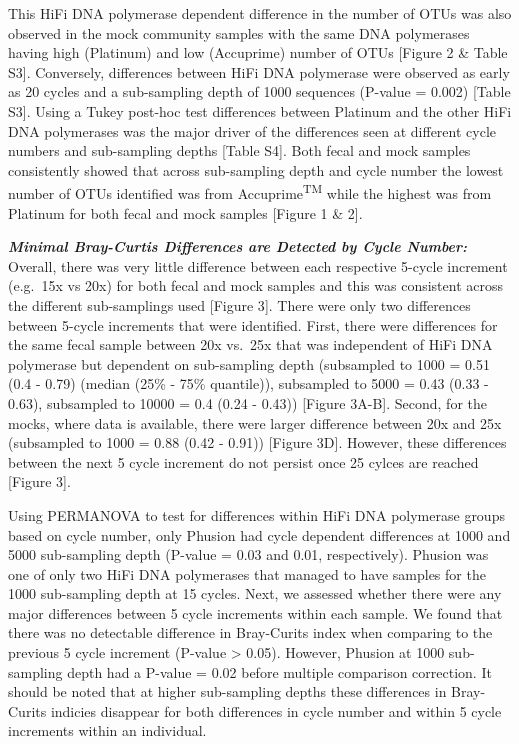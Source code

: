 \documentclass[12pt,]{article}
\begin{document}
This HiFi DNA polymerase dependent difference in the number of OTUs was
also observed in the mock community samples with the same DNA
polymerases having high (Platinum) and low (Accuprime) number of OTUs
{[}Figure 2 \& Table S3{]}. Conversely, differences between HiFi DNA
polymerase were observed as early as 20 cycles and a sub-sampling depth
of 1000 sequences (P-value = 0.002) {[}Table S3{]}. Using a Tukey
post-hoc test differences between Platinum and the other HiFi DNA
polymerases was the major driver of the differences seen at different
cycle numbers and sub-sampling depths {[}Table S4{]}. Both fecal and
mock samples consistently showed that across sub-sampling depth and
cycle number the lowest number of OTUs identified was from
Accuprime\textsuperscript{TM} while the highest was from Platinum for
both fecal and mock samples {[}Figure 1 \& 2{]}.

\textbf{\emph{Minimal Bray-Curtis Differences are Detected by Cycle
Number:}} Overall, there was very little difference between each
respective 5-cycle increment (e.g.~15x vs 20x) for both fecal and mock
samples and this was consistent across the different sub-samplings used
{[}Figure 3{]}. There were only two differences between 5-cycle
increments that were identified. First, there were differences for the
same fecal sample between 20x vs.~25x that was independent of HiFi DNA
polymerase but dependent on sub-sampling depth (subsampled to 1000 =
0.51 (0.4 - 0.79) (median (25\% - 75\% quantile)), subsampled to 5000 =
0.43 (0.33 - 0.63), subsampled to 10000 = 0.4 (0.24 - 0.43)) {[}Figure
3A-B{]}. Second, for the mocks, where data is available, there were
larger difference between 20x and 25x (subsampled to 1000 = 0.88 (0.42 -
0.91)) {[}Figure 3D{]}. However, these differences between the next 5
cycle increment do not persist once 25 cylces are reached {[}Figure
3{]}.

Using PERMANOVA to test for differences within HiFi DNA polymerase
groups based on cycle number, only Phusion had cycle dependent
differences at 1000 and 5000 sub-sampling depth (P-value = 0.03 and
0.01, respectively). Phusion was one of only two HiFi DNA polymerases
that managed to have samples for the 1000 sub-sampling depth at 15
cycles. Next, we assessed whether there were any major differences
between 5 cycle increments within each sample. We found that there was
no detectable difference in Bray-Curits index when comparing to the
previous 5 cycle increment (P-value \textgreater{} 0.05). However,
Phusion at 1000 sub-sampling depth had a P-value = 0.02 before multiple
comparison correction. It should be noted that at higher sub-sampling
depths these differences in Bray-Curits indicies disappear for both
differences in cycle number and within 5 cycle increments within an
individual.
\end{document}
